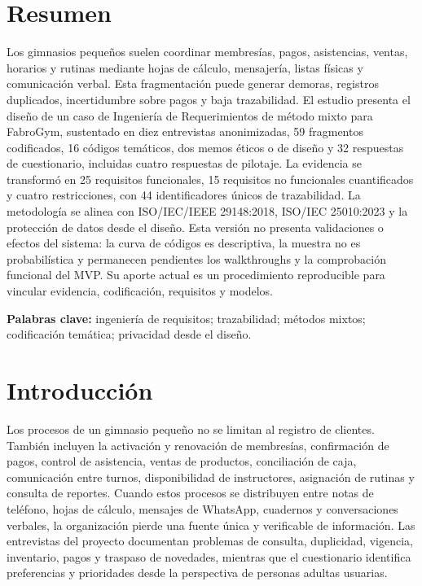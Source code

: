 \documentclass[11pt,a4paper]{article}
\begin{document}
\section*{Resumen}
Los gimnasios pequeños suelen coordinar membresías, pagos, asistencias, ventas, horarios y rutinas mediante hojas de cálculo, mensajería, listas físicas y comunicación verbal. Esta fragmentación puede generar demoras, registros duplicados, incertidumbre sobre pagos y baja trazabilidad. El estudio presenta el diseño de un caso de Ingeniería de Requerimientos de método mixto para FabroGym, sustentado en diez entrevistas anonimizadas, 59 fragmentos codificados, 16 códigos temáticos, dos memos éticos o de diseño y 32 respuestas de cuestionario, incluidas cuatro respuestas de pilotaje. La evidencia se transformó en 25 requisitos funcionales, 15 requisitos no funcionales cuantificados y cuatro restricciones, con 44 identificadores únicos de trazabilidad. La metodología se alinea con ISO/IEC/IEEE 29148:2018, ISO/IEC 25010:2023 y la protección de datos desde el diseño. Esta versión no presenta validaciones o efectos del sistema: la curva de códigos es descriptiva, la muestra no es probabilística y permanecen pendientes los walkthroughs y la comprobación funcional del MVP. Su aporte actual es un procedimiento reproducible para vincular evidencia, codificación, requisitos y modelos.

\textbf{Palabras clave:} ingeniería de requisitos; trazabilidad; métodos mixtos; codificación temática; privacidad desde el diseño.

\section{Introducción}

Los procesos de un gimnasio pequeño no se limitan al registro de clientes. También incluyen la activación y renovación de membresías, confirmación de pagos, control de asistencia, ventas de productos, conciliación de caja, comunicación entre turnos, disponibilidad de instructores, asignación de rutinas y consulta de reportes. Cuando estos procesos se distribuyen entre notas de teléfono, hojas de cálculo, mensajes de WhatsApp, cuadernos y conversaciones verbales, la organización pierde una fuente única y verificable de información. Las entrevistas del proyecto documentan problemas de consulta, duplicidad, vigencia, inventario, pagos y traspaso de novedades, mientras que el cuestionario identifica preferencias y prioridades desde la perspectiva de personas adultas usuarias.
\end{document}
